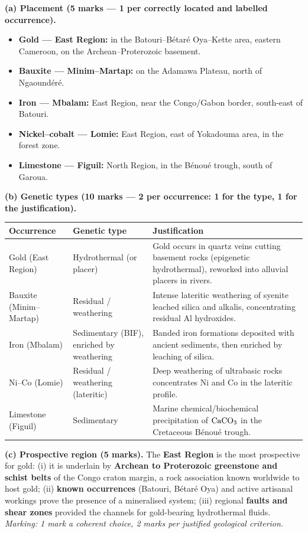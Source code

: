 \documentclass[11pt]{article}
\begin{document}
\begin{corrige}
\textbf{(a) Placement (5 marks — 1 per correctly located and labelled occurrence).}
\begin{itemize}
\item \textbf{Gold — East Region:} in the Batouri--B\'etar\'e Oya--Kette area, eastern Cameroon, on the Archean--Proterozoic basement.
\item \textbf{Bauxite — Minim--Martap:} on the Adamawa Plateau, north of Ngaound\'er\'e.
\item \textbf{Iron — Mbalam:} East Region, near the Congo/Gabon border, south-east of Batouri.
\item \textbf{Nickel--cobalt — Lomie:} East Region, east of Yokadouma area, in the forest zone.
\item \textbf{Limestone — Figuil:} North Region, in the B\'enou\'e trough, south of Garoua.
\end{itemize}
\textbf{(b) Genetic types (10 marks — 2 per occurrence: 1 for the type, 1 for the justification).}
\begin{center}
\begin{tabularx}{\linewidth}{|l|l|X|}
\hline
\rowcolor{popblueL} \textbf{Occurrence} & \textbf{Genetic type} & \textbf{Justification} \\
\hline
Gold (East Region) & Hydrothermal (or placer) & Gold occurs in quartz veins cutting basement rocks (epigenetic hydrothermal), reworked into alluvial placers in rivers. \\
\hline
Bauxite (Minim--Martap) & Residual / weathering & Intense lateritic weathering of syenite leached silica and alkalis, concentrating residual Al hydroxides. \\
\hline
Iron (Mbalam) & Sedimentary (BIF), enriched by weathering & Banded iron formations deposited with ancient sediments, then enriched by leaching of silica. \\
\hline
Ni--Co (Lomie) & Residual / weathering (lateritic) & Deep weathering of ultrabasic rocks concentrates Ni and Co in the lateritic profile. \\
\hline
Limestone (Figuil) & Sedimentary & Marine chemical/biochemical precipitation of $\ce{CaCO3}$ in the Cretaceous B\'enou\'e trough. \\
\hline
\end{tabularx}
\end{center}
\textbf{(c) Prospective region (5 marks).} The \textbf{East Region} is the most prospective for gold: (i) it is underlain by \textbf{Archean to Proterozoic greenstone and schist belts} of the Congo craton margin, a rock association known worldwide to host gold; (ii) \textbf{known occurrences} (Batouri, B\'etar\'e Oya) and active artisanal workings prove the presence of a mineralised system; (iii) regional \textbf{faults and shear zones} provided the channels for gold-bearing hydrothermal fluids. \emph{Marking: 1 mark a coherent choice, 2 marks per justified geological criterion.}
\end{corrige}
\end{document}
